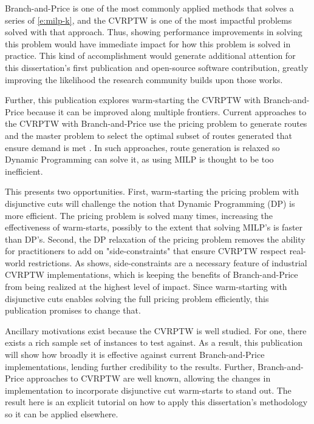 \documentclass[10pt]{article}
\begin{document}
	Branch-and-Price is one of the most commonly applied methods that solves a series of \ref{e:milp-k}, and the CVRPTW is one of the most impactful problems solved with that approach. Thus, showing performance improvements in solving this problem would have immediate impact for how this problem is solved in practice. This kind of accomplishment would generate additional attention for this dissertation's first publication and open-source software contribution, greatly improving the likelihood the research community builds upon those works.
	
	Further, this publication explores warm-starting the CVRPTW with Branch-and-Price because it can be improved along multiple frontiers. Current approaches to the CVRPTW with Branch-and-Price use the pricing problem to generate routes and the master problem to select the optimal subset of routes generated that ensure demand is met \cite{vrp-bap}. In such approaches, route generation is relaxed so Dynamic Programming can solve it, as using MILP is thought to be too inefficient.
	
	This presents two opportunities. First, warm-starting the pricing problem with disjunctive cuts will challenge the notion that Dynamic Programming (DP) is more efficient. The pricing problem is solved many times, increasing the effectiveness of warm-starts, possibly to the extent that solving MILP's is faster than DP's. Second, the DP relaxation of the pricing problem removes the ability for practitioners to add on "side-constraints" that ensure CVRPTW respect real-world restrictions. As \cite{ehsan} shows, side-constraints are a necessary feature of industrial CVRPTW implementations, which is keeping the benefits of Branch-and-Price from being realized at the highest level of impact. Since warm-starting with disjunctive cuts enables solving the full pricing problem efficiently, this publication promises to change that.
	
	Ancillary motivations exist because the CVRPTW is well studied. For one, there exists a rich sample set of instances to test against. As a result, this publication will show how broadly it is effective against current Branch-and-Price implementations, lending further credibility to the results. Further, Branch-and-Price approaches to CVRPTW are well known, allowing the changes in implementation to incorporate disjunctive cut warm-starts to stand out. The result here is an explicit tutorial on how to apply this dissertation's methodology so it can be applied elsewhere.
	
\end{document}

